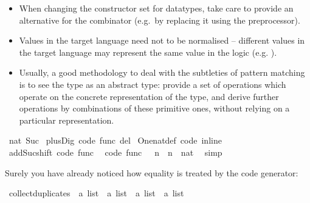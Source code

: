 \begin{isabellebody}
\begin{isamarkuptext}
  \begin{itemize}
    \item When changing the constructor set for datatypes, take care to
      provide an alternative for the  combinator (e.g.~by replacing
      it using the preprocessor).
    \item Values in the target language need not to be normalised -- different
      values in the target language may represent the same value in the
      logic (e.g. ).
    \item Usually, a good methodology to deal with the subtleties of pattern
      matching is to see the type as an abstract type: provide a set
      of operations which operate on the concrete representation of the type,
      and derive further operations by combinations of these primitive ones,
      without relying on a particular representation.
  \end{itemize}%
\end{isamarkuptext}%
\isamarkuptrue%
%
\isadeliminvisible
%
\endisadeliminvisible
%
\isataginvisible
{}\isamarkupfalse%
\ {\isachardoublequoteopen}{}{\isacharcolon}{\isacharcolon}nat{\isachardoublequoteclose}\ Suc\isanewline
{}\isamarkupfalse%
\ plus{\isacharunderscore}Dig\ {\isacharbrackleft}code\ func\ del{\isacharbrackright}\isanewline
{}\isamarkupfalse%
\ One{\isacharunderscore}nat{\isacharunderscore}def\ {\isacharbrackleft}code\ inline{\isacharbrackright}\isanewline
{}\isamarkupfalse%
\ add{\isacharunderscore}Suc{\isacharunderscore}shift\ {\isacharbrackleft}code\ func{\isacharbrackright}\ \isanewline
{}\isamarkupfalse%
\ {\isacharbrackleft}code\ func{\isacharbrackright}{\isacharcolon}\ {\isachardoublequoteopen}{}\ {\isacharplus}\ n\ {\isacharequal}\ {\isacharparenleft}n\ {\isasymColon}\ nat{\isacharparenright}{\isachardoublequoteclose}\ \isamarkupfalse%
\ simp%
\endisataginvisible
{\isafoldinvisible}%
%
\isadeliminvisible
%
\endisadeliminvisible
%
\isamarkuptrue%
%
\begin{isamarkuptext}%
Surely you have already noticed how equality is treated
  by the code generator:%
\end{isamarkuptext}%
\isamarkuptrue%
%
\isadelimquoteme
%
\endisadelimquoteme
%
\isatagquoteme
{}\isamarkupfalse%
\ collect{\isacharunderscore}duplicates\ {\isacharcolon}{\isacharcolon}\ {\isachardoublequoteopen}{\isacharprime}a\ list\ {\isasymRightarrow}\ {\isacharprime}a\ list\ {\isasymRightarrow}\ {\isacharprime}a\ list\ {\isasymRightarrow}\ {\isacharprime}a\ list{\isachardoublequoteclose}\ \isanewline

\end{isabellebody}
